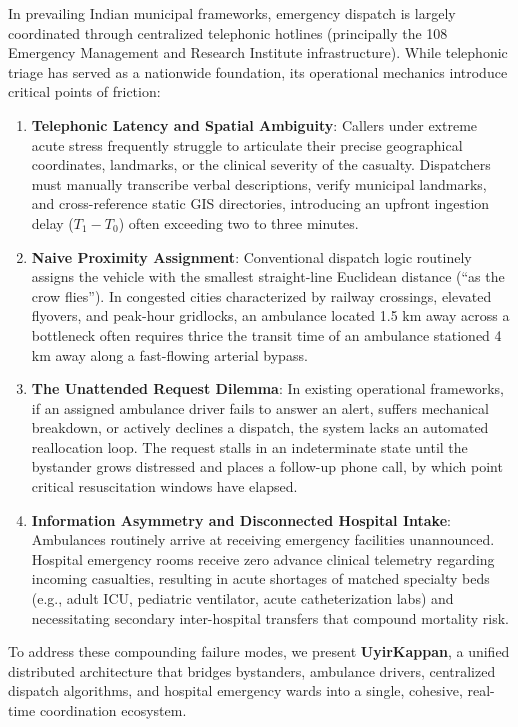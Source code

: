 \documentclass[conference]{IEEEtran}
\begin{document}
In prevailing Indian municipal frameworks, emergency dispatch is largely coordinated through centralized telephonic hotlines (principally the 108 Emergency Management and Research Institute infrastructure). While telephonic triage has served as a nationwide foundation, its operational mechanics introduce critical points of friction:
\begin{enumerate}
    \item \textbf{Telephonic Latency and Spatial Ambiguity}: Callers under extreme acute stress frequently struggle to articulate their precise geographical coordinates, landmarks, or the clinical severity of the casualty. Dispatchers must manually transcribe verbal descriptions, verify municipal landmarks, and cross-reference static GIS directories, introducing an upfront ingestion delay ($T_1 - T_0$) often exceeding two to three minutes.
    \item \textbf{Naive Proximity Assignment}: Conventional dispatch logic routinely assigns the vehicle with the smallest straight-line Euclidean distance (``as the crow flies''). In congested cities characterized by railway crossings, elevated flyovers, and peak-hour gridlocks, an ambulance located 1.5 km away across a bottleneck often requires thrice the transit time of an ambulance stationed 4 km away along a fast-flowing arterial bypass.
    \item \textbf{The Unattended Request Dilemma}: In existing operational frameworks, if an assigned ambulance driver fails to answer an alert, suffers mechanical breakdown, or actively declines a dispatch, the system lacks an automated reallocation loop. The request stalls in an indeterminate state until the bystander grows distressed and places a follow-up phone call, by which point critical resuscitation windows have elapsed.
    \item \textbf{Information Asymmetry and Disconnected Hospital Intake}: Ambulances routinely arrive at receiving emergency facilities unannounced. Hospital emergency rooms receive zero advance clinical telemetry regarding incoming casualties, resulting in acute shortages of matched specialty beds (e.g., adult ICU, pediatric ventilator, acute catheterization labs) and necessitating secondary inter-hospital transfers that compound mortality risk.
\end{enumerate}

To address these compounding failure modes, we present \textbf{UyirKappan}, a unified distributed architecture that bridges bystanders, ambulance drivers, centralized dispatch algorithms, and hospital emergency wards into a single, cohesive, real-time coordination ecosystem.
\end{document}

